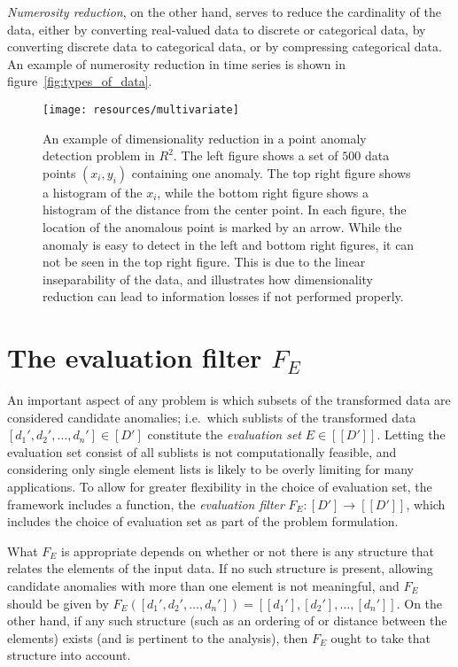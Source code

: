 \emph{Numerosity reduction}, on the other hand, serves to reduce the cardinality of the data, either by converting real-valued data to discrete or categorical data, by converting discrete data to categorical data, or by compressing categorical data. An example of numerosity reduction in time series is shown in figure~\ref{fig:types_of_data}.

\begin{figure}[htb]
\begin{center}
\leavevmode
\texttt{[image: resources/multivariate]}
\end{center}
\caption{\small{An example of dimensionality reduction in a point anomaly detection problem in $R^2$. The left figure shows a set of $500$ data points $(x_i, y_i)$ containing one anomaly. The top right figure shows a histogram of the $x_i$, while the bottom right figure shows a histogram of the distance from the center point. In each figure, the location of the anomalous point is marked by an arrow. While the anomaly is easy to detect in the left and bottom right figures, it can not be seen in the top right figure. This is due to the linear inseparability of the data, and illustrates how dimensionality reduction can lead to information losses if not performed properly.}}
\label{fig:dimensionality_reduction}
\end{figure}

\section{The evaluation filter $F_E$}

An important aspect of any problem is which subsets of the transformed data are considered candidate anomalies; i.e.\ which sublists of the transformed data $[d_1', d_2', \dots, d_n'] \in [D']$ constitute the \emph{evaluation set} $E \in [[D']]$. Letting the evaluation set consist of all sublists is not computationally feasible, and considering only single element lists is likely to be overly limiting for many applications. To allow for greater flexibility in the choice of evaluation set, the framework includes a function, the \emph{evaluation filter} $F_E: [D'] \rightarrow [[D']]$, which includes the choice of evaluation set as part of the problem formulation.

What $F_E$ is appropriate depends on whether or not there is any structure that relates the elements of the input data. If no such structure is present, allowing candidate anomalies with more than one element is not meaningful, and $F_E$ should be given by $F_E([d_1', d_2', \dots, d_n']) = [[d_1'], [d_2'], \dots, [d_n']]$. On the other hand, if any such structure (such as an ordering of or distance between the elements) exists (and is pertinent to the analysis), then $F_E$ ought to take that structure into account.


